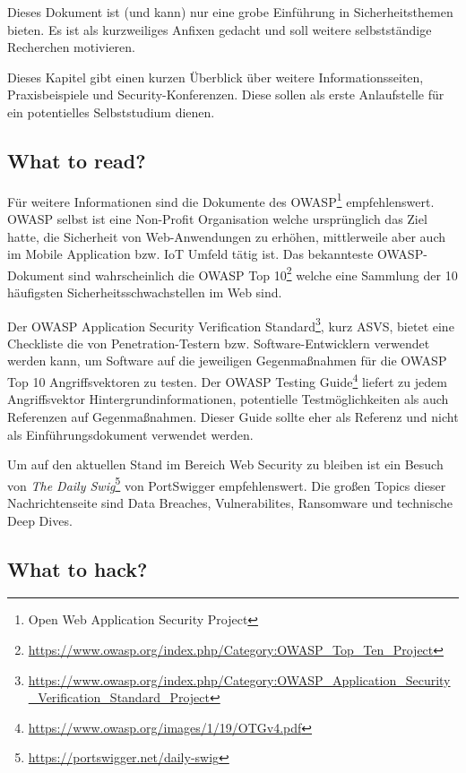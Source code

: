 Dieses Dokument ist (und kann) nur eine grobe Einführung in Sicherheitsthemen bieten. Es ist als kurzweiliges Anfixen gedacht und soll weitere selbstständige Recherchen motivieren.

Dieses Kapitel gibt einen kurzen Überblick über weitere Informationsseiten, Praxisbeispiele und Security-Konferenzen. Diese sollen als erste Anlaufstelle für ein potentielles Selbststudium dienen.

\subsection{What to read?}

Für weitere Informationen sind die Dokumente des OWASP\footnote{Open Web Application Security Project} empfehlenswert. OWASP selbst ist eine Non-Profit Organisation welche ursprünglich das Ziel hatte, die Sicherheit von Web-Anwendungen zu erhöhen, mittlerweile aber auch im Mobile Application bzw. IoT Umfeld tätig ist. Das bekannteste OWASP-Dokument sind wahrscheinlich die OWASP Top 10\footnote{\url{https://www.owasp.org/index.php/Category:OWASP_Top_Ten_Project}} welche eine Sammlung der 10 häufigsten Sicherheitsschwachstellen im Web sind.

Der OWASP Application Security Verification Standard\footnote{\url{https://www.owasp.org/index.php/Category:OWASP_Application_Security_Verification_Standard_Project}}, kurz ASVS, bietet eine Checkliste die von Penetration-Testern bzw. Software-Entwicklern verwendet werden kann, um Software auf die jeweiligen Gegenmaßnahmen für die OWASP Top 10 Angriffsvektoren zu testen. Der OWASP Testing Guide\footnote{\url{https://www.owasp.org/images/1/19/OTGv4.pdf}} liefert zu jedem Angriffsvektor Hintergrundinformationen, potentielle Testmöglichkeiten als auch Referenzen auf Gegenmaßnahmen. Dieser Guide sollte eher als Referenz und nicht als Einführungsdokument verwendet werden.

Um auf den aktuellen Stand im Bereich Web Security zu bleiben ist ein Besuch von \textit{The Daily Swig}\footnote{\url{https://portswigger.net/daily-swig}} von PortSwigger empfehlenswert. Die großen Topics dieser Nachrichtenseite sind Data Breaches, Vulnerabilites, Ransomware und technische Deep Dives.

\subsection{What to hack?}

